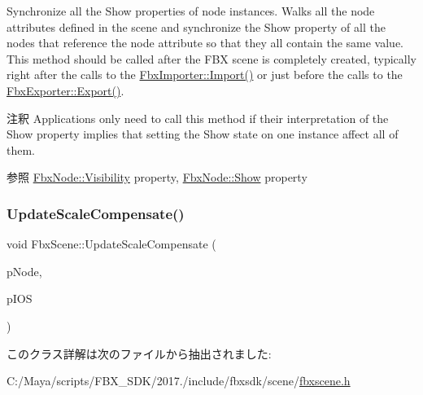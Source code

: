 Synchronize all the Show properties of node instances. Walks all the node attributes defined in the scene and synchronize the Show property of all the nodes that reference the node attribute so that they all contain the same value. This method should be called after the F\+BX scene is completely created, typically right after the calls to the \hyperlink{class_fbx_importer_a1c5a7f9ee8a6952c1e039065cfa09659}{Fbx\+Importer\+::\+Import()} or just before the calls to the \hyperlink{class_fbx_exporter_a8a92372cf76fe3486a798c87973cc791}{Fbx\+Exporter\+::\+Export()}. \begin{DoxyRemark}{注釈}
Applications only need to call this method if their interpretation of the Show property implies that setting the Show state on one instance affect all of them. 
\end{DoxyRemark}
\begin{DoxySeeAlso}{参照}
\hyperlink{class_fbx_node_a9f02f0a70b81c1a656137def3e34edb7}{Fbx\+Node\+::\+Visibility} property, \hyperlink{class_fbx_node_a685ccf0b6e1bc5070c28d9e7a8823c74}{Fbx\+Node\+::\+Show} property 
\end{DoxySeeAlso}
\mbox{\label{class_fbx_scene_a68b89374967020ed469645de47eb4507}} 
\subsubsection{\texorpdfstring{Update\+Scale\+Compensate()}{UpdateScaleCompensate()}}
{\footnotesize\ttfamily void Fbx\+Scene\+::\+Update\+Scale\+Compensate (\begin{DoxyParamCaption}\item[{\hyperlink{class_fbx_node}{Fbx\+Node} $\ast$}]{p\+Node,  }\item[{\hyperlink{class_fbx_i_o_settings}{Fbx\+I\+O\+Settings} \&}]{p\+I\+OS }\end{DoxyParamCaption})}



このクラス詳解は次のファイルから抽出されました\+:\begin{DoxyCompactItemize}
\item 
C\+:/\+Maya/scripts/\+F\+B\+X\+\_\+\+S\+D\+K/2017./include/fbxsdk/scene/\hyperlink{fbxscene_8h}{fbxscene.\+h}\end{DoxyCompactItemize}
